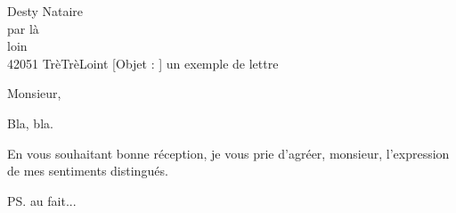 \documentclass[
paper=a4,
layout,
fontsize=11pt
]{scrlttr2}
\begin{document}
\begin{letter}{Desty Nataire\\
    par là\\
    loin\\
    42051 TrèTrèLoint}
  [Objet : ]%
  {un exemple de lettre}

  \opening{Monsieur,}

  Bla, bla.

  \closing{En vous souhaitant bonne réception, je vous prie d'agréer,
    monsieur, l'expression de mes sentiments distingués.}

  \ps{au fait...}
\end{letter}
\end{document}
